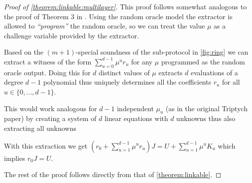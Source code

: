 \begin{proof}[Proof of \cref{theorem:linkable:multilayer}]
	This proof follows somewhat analogous to the proof of Theorem 3 in \cite{triptych}.
	Using the random oracle model the extractor is allowed to \emph{``program''} the random oracle, so we can treat the value $\mu$ as a challenge variable provided by the extractor.

	Based on the $(m+1)$-special soundness of the sub-protocol in \cref{fig:ring} we can extract a witness of the form $\sum_{u=0}^{d-1} \mu^u r_u$ for any $\mu$ programmed as the random oracle output.
	Doing this for $d$ distinct values of $\mu$ extracts $d$ evaluations of a degree $d-1$ polynomial thus uniquely determines all the coefficients $r_u$ for all $u \in \{ 0, ..., d-1 \}$.

	\NB This would work analogous for $d-1$ independent $\mu_u$ (as in the original Triptych paper) by creating a system of $d$ linear equations with $d$ unknowns thus also extracting all unknowns


	With this extraction we get $(r_0 + \sum_{u=1}^{d-1} \mu^u r_u) J = U + \sum_{u=1}^{d-1} \mu^u K_u$ which implies $r_0 J = U$.

	The rest of the proof follows directly from that of \cref{theorem:linkable}.
\end{proof}

